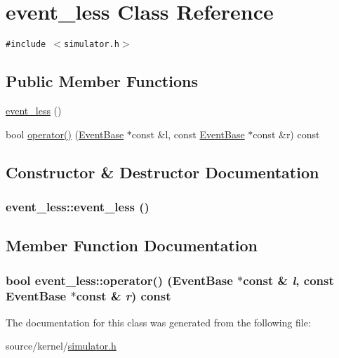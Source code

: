\hypertarget{classevent__less}{
\section{event\_\-less Class Reference}
\label{classevent__less}
}
{\tt \#include $<$simulator.h$>$}

\subsection*{Public Member Functions}
\begin{CompactItemize}
\item 
\hyperlink{classevent__less_b721525a6ed5ec4551920178ea91726c}{event\_\-less} ()
\item 
bool \hyperlink{classevent__less_280b704ba9909d43362de372d0a45523}{operator()} (\hyperlink{classEventBase}{EventBase} $\ast$const \&l, const \hyperlink{classEventBase}{EventBase} $\ast$const \&r) const 
\end{CompactItemize}


\subsection{Constructor \& Destructor Documentation}
\hypertarget{classevent__less_b721525a6ed5ec4551920178ea91726c}{
\subsubsection[{event\_\-less}]{\setlength{\rightskip}{0pt plus 5cm}event\_\-less::event\_\-less ()}}
\label{classevent__less_b721525a6ed5ec4551920178ea91726c}




\subsection{Member Function Documentation}
\hypertarget{classevent__less_280b704ba9909d43362de372d0a45523}{
\subsubsection[{operator()}]{\setlength{\rightskip}{0pt plus 5cm}bool event\_\-less::operator() ({\bf EventBase} $\ast$const \& {\em l}, \/  const {\bf EventBase} $\ast$const \& {\em r}) const}}
\label{classevent__less_280b704ba9909d43362de372d0a45523}




The documentation for this class was generated from the following file:\begin{CompactItemize}
\item 
source/kernel/\hyperlink{simulator_8h}{simulator.h}\end{CompactItemize}
